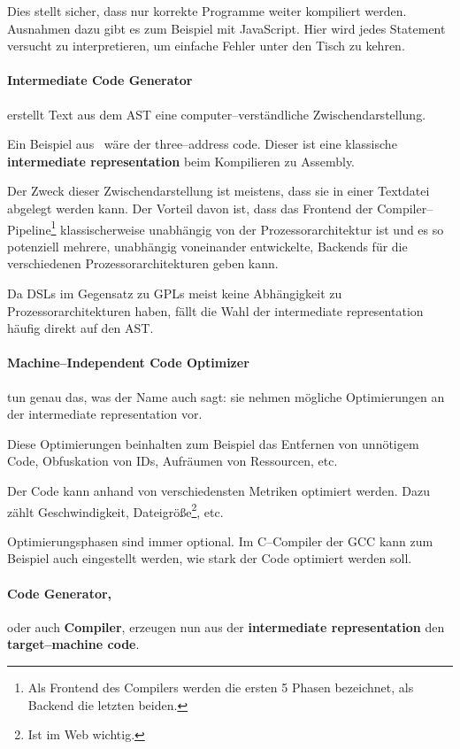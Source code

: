 Dies stellt sicher, dass nur korrekte Programme weiter kompiliert werden.
Ausnahmen dazu gibt es zum Beispiel mit JavaScript.
Hier wird jedes Statement versucht zu interpretieren, um einfache Fehler unter den Tisch zu kehren.

\paragraph{Intermediate Code Generator} erstellt Text aus dem \ac{AST} eine computer--verständliche Zwischendarstellung.

Ein Beispiel aus~\cite{aho-2006} wäre der three--address code.
Dieser ist eine klassische \textbf{intermediate representation} beim Kompilieren zu Assembly.

Der Zweck dieser Zwischendarstellung ist meistens, dass sie in einer Textdatei abgelegt werden kann.
Der Vorteil davon ist, dass das Frontend der Compiler--Pipeline\footnote{Als Frontend des Compilers werden die ersten 5 Phasen bezeichnet, als Backend die letzten beiden.} klassischerweise unabhängig von der Prozessorarchitektur ist und es so potenziell mehrere, unabhängig voneinander entwickelte, Backends für die verschiedenen Prozessorarchitekturen geben kann.

Da \acp{DSL} im Gegensatz zu \acp{GPL} meist keine Abhängigkeit zu Prozessorarchitekturen haben, fällt die Wahl der intermediate representation häufig direkt auf den \ac{AST}.

\paragraph{Machine--Independent Code Optimizer} tun genau das, was der Name auch sagt: sie nehmen mögliche Optimierungen an der intermediate representation vor.

Diese Optimierungen beinhalten zum Beispiel das Entfernen von unnötigem Code, Obfuskation von \acp{ID}, Aufräumen von Ressourcen, etc.

Der Code kann anhand von verschiedensten Metriken optimiert werden.
Dazu zählt Geschwindigkeit, Dateigröße\footnote{Ist im Web wichtig.}, etc.

Optimierungsphasen sind immer optional.
Im C--Compiler der \ac{GCC} kann zum Beispiel auch eingestellt werden, wie stark der Code optimiert werden soll.~\autocite{gnu-project-no-date}

\paragraph{Code Generator,} oder auch \textbf{Compiler}, erzeugen nun aus der \textbf{intermediate representation} den \textbf{target--machine code}.

